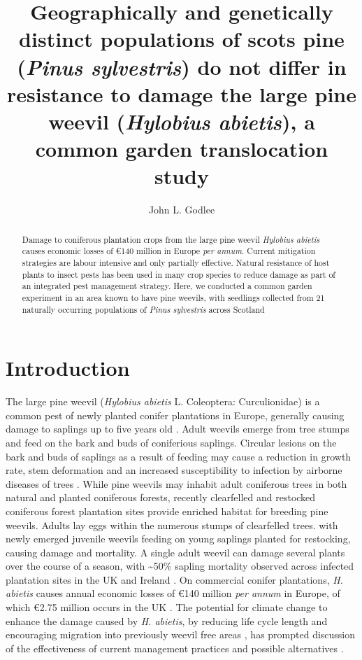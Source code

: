 \documentclass[a4paper, 11pt]{article}
\title{Geographically and genetically distinct populations of scots pine (\textit{Pinus sylvestris}) do not differ in resistance to damage the large pine weevil (\textit{Hylobius abietis}), a common garden translocation study}
\author{John L. Godlee}
\begin{document}

\maketitle{}

\begin{abstract}
    Damage to coniferous plantation crops from the large pine weevil \textit{Hylobius abietis} causes economic losses of \euro{}140 million in Europe \textit{per annum}. Current mitigation strategies are labour intensive and only partially effective. Natural resistance of host plants to insect pests has been used in many crop species to reduce damage as part of an integrated pest management strategy. Here, we conducted a common garden experiment in an area known to have pine weevils, with seedlings collected from 21 naturally occurring populations of \textit{Pinus sylvestris} across Scotland

\end{abstract}

\section*{Introduction}

The large pine weevil (\textit{Hylobius abietis} L. Coleoptera: Curculionidae) is a common pest of newly planted conifer plantations in Europe, generally causing damage to saplings up to five years old \citep{Dillon2008}. Adult weevils emerge from tree stumps and feed on the bark and buds of coniferious saplings. Circular lesions on the bark and buds of saplings as a result of feeding may cause a reduction in growth rate, stem deformation and an increased susceptibility to infection by airborne diseases of trees \citep{Leather1999}. While pine weevils may inhabit adult coniferous trees in both natural and planted coniferous forests, recently clearfelled and restocked coniferous forest plantation sites provide enriched habitat for breeding pine weevils. Adults lay eggs within the numerous stumps of clearfelled trees. with newly emerged juvenile weevils feeding on young saplings planted for restocking, causing damage and mortality. A single adult weevil can damage several plants over the course of a season, with \textasciitilde{}50\% sapling mortality observed across infected plantation sites in the UK and Ireland \citep{Heritage2001}. On commercial conifer plantations, \textit{H. abietis} causes annual economic losses of \euro{}140 million \textit{per annum} in Europe, of which \euro{}2.75 million occurs in the UK \citep{Evans2015}. The potential for climate change to enhance the damage caused by \textit{H. abietis}, by reducing life cycle length \citep{} and encouraging migration into previously weevil free areas \citep{}, has prompted discussion of the effectiveness of current management practices and possible alternatives \citep{}.
\end{document}
